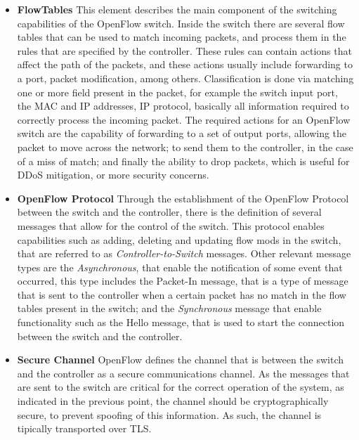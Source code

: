 \begin {enumerate}
\begin {itemize}
    \item \textbf {FlowTables} This element describes the main component of the switching capabilities of the OpenFlow switch. Inside the switch there are several
        flow tables that can be used to match incoming packets, and process them in the rules that are specified by the controller. These rules can contain actions
        that affect the path of the packets, and these actions usually include forwarding to a port, packet modification, among others. Classification is done via 
        matching one or more field present in the packet, for example the switch input port, the MAC and IP addresses, IP protocol, basically all information
        required to correctly process the incoming packet. The required actions for an OpenFlow switch are the capability of forwarding to a set of output ports,
        allowing the packet to move across the network; to send them to the controller, in the case of a miss of match; and finally the ability to drop packets, 
        which is useful for DDoS mitigation, or more security concerns.
    \item \textbf {OpenFlow Protocol} Through the establishment of the OpenFlow Protocol between the switch and the controller, there is the definition of several
        messages that allow for the control of the switch. This protocol enables capabilities such as adding, deleting and updating flow mods in the switch, that are
        referred to as \textit {Controller-to-Switch} messages. Other relevant message types are the \textit {Asynchronous}, that enable the notification of some
        event that occurred, this type includes the Packet-In message, that is a type of message that is sent to the controller when a certain packet has no match in
        the flow tables present in the switch; and the \textit{ Synchronous} message that enable functionality such as the Hello message, that is used to start the
        connection between the switch and the controller.
    \item \textbf {Secure Channel} OpenFlow defines the channel that is between the switch and the controller as a secure communications channel. As the messages 
        that are sent to the switch are critical for the correct operation of the system, as indicated in the previous point, the channel should be cryptographically
        secure, to prevent spoofing of this information. As such, the channel is tipically transported over TLS.
\end {itemize}


\end{enumerate}
